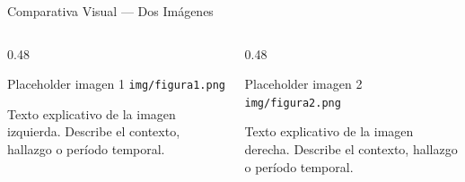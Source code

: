 \begin{frame}{Comparativa Visual — Dos Imágenes}
  \begin{columns}[T]
    \begin{column}{0.48\textwidth}
      \centering
      \begin{alertblock}{Placeholder imagen 1}
        \texttt{img/figura1.png}
      \end{alertblock}
      {\small Texto explicativo de la imagen izquierda. Describe el contexto, hallazgo o período temporal.}\\[0.05cm]
    \end{column}
    \begin{column}{0.48\textwidth}
      \centering
      \begin{alertblock}{Placeholder imagen 2}
        \texttt{img/figura2.png}
      \end{alertblock}
      {\small Texto explicativo de la imagen derecha. Describe el contexto, hallazgo o período temporal.}\\[0.05cm]
    \end{column}
  \end{columns}
\end{frame}

